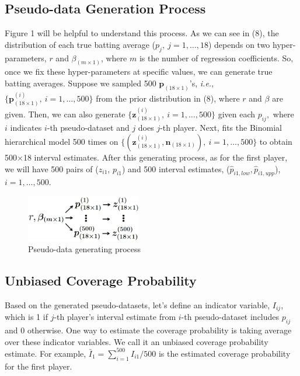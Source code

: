 \documentclass[article]{jss}
\begin{document}
\subsection{Pseudo-data Generation Process}
Figure 1 will be helpful to understand this process. As we can see in (8), the distribution of each true batting average ($p_{j},~j=1,\ldots, 18$) depends on two hyper-parameters, $r$ and $\beta_{(m\times1)}$, where $m$ is the number of regression coefficients. So, once we fix these hyper-parameters at specific values, we can generate true batting averages. Suppose we sampled 500 $\mathbf{p}_{(18\times1)}$'s, \emph{i.e.}, $\{\mathbf{p}^{(i)}_{(18\times1)},~i=1, \ldots, 500\}$ from the prior distribution in (8), where $r$ and $\beta$ are given. Then, we can also generate $\{\mathbf{z}^{(i)}_{(18\times1)},~i=1, \ldots, 500\}$ given each $p_{ij},$ where $i$ indicates $i$-th pseudo-dataset and $j$ does $j$-th player. Next,  fits the Binomial hierarchical model 500 times on $\{(\mathbf{z}^{(i)}_{(18\times1)}, \mathbf{n}_{(18 \times 1)}),~i=1, \ldots, 500\}$ to obtain 500$\times$18 interval estimates.  After this generating process, as for the first player, we will have 500 pairs of ($z_{i1}$, $p_{i1}$) and 500 interval estimates, ($\hat{p}_{i1, low}, \hat{p}_{i1, upp}$), $i=1, \ldots, 500$.
\begin{figure}[h]
\begin{center}
\includegraphics[width=5cm]{process.png}
\caption{Pseudo-data generating process}
\end{center}
\end{figure}

\subsection{Unbiased Coverage Probability}
Based on the generated pseudo-datasets, let's define an indicator variable, $I_{ij}$, which is 1 if $j$-th player's interval estimate from $i$-th pseudo-dataset includes $p_{ij}$ and 0 otherwise. One way to estimate the coverage probability is taking average over these indicator variables. We call it an unbiased coverage probability estimate. For example, $\bar{I}_{1}=\sum_{i=1}^{500}I_{i1}/500$ is the estimated coverage probability for the first player.
\end{document}
